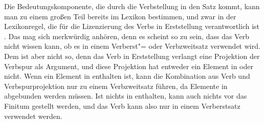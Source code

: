 Die Bedeutungskomponente, die durch die Verbstellung in den Satz kommt, kann man zu einem
großen Teil bereits im Lexikon bestimmen, und zwar in der Lexikonregel, die für die Lizenzierung
des Verbs in Erststellung verantwortlich ist \citep[]{Kiss95b}. Das mag sich merkwürdig anhören, denn es scheint
so zu sein, dass das Verb nicht wissen kann, ob es in einem Verberst"= oder Verbzweitsatz verwendet
wird. Dem ist aber nicht so, denn das Verb in Erststellung verlangt eine Projektion der Verbspur
als Argument, und diese Projektion hat entweder ein Element in \slasch oder nicht. Wenn ein Element
in \slasch enthalten ist, kann die Kombination aus Verb und Verbspurprojektion nur zu einem Verbzweitsatz
führen, da Elemente in \slasch abgebunden werden müssen. Ist nichts in \slasch enthalten, kann auch nichts
vor das Finitum gestellt werden, und das Verb kann also nur in einem Verberstsatz verwendet werden.

